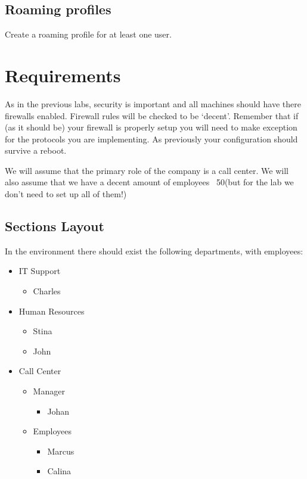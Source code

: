 \documentclass[paper=a4, fontsize=11pt]{report} %
\begin{document}
\subsection{Roaming profiles}
Create a roaming profile for at least one user.

\section{Requirements}
As in the previous labs, security is important and all machines should have there firewalls enabled. Firewall rules will be checked to be ‘decent’. Remember that if (as it should be) your firewall is properly setup you will need to make exception for the protocols you are implementing.
As previously your configuration should survive a reboot.

We will assume that the primary role of the company is a call center. We will also assume that we have a decent amount of employees ~50(but for the lab we don’t need to set up all of them!)
\subsection{Sections Layout}
In the environment there should exist the following departments, with employees:
\begin{itemize}
	\item IT Support
	\begin{itemize}
		\item Charles
	\end{itemize}
\end{itemize}
\begin{itemize}
	\item Human Resources
	\begin{itemize}
		\item Stina
		\item John
	\end{itemize}
\end{itemize}
\begin{itemize}
	\item Call Center
	\begin{itemize}
		\item Manager	
		\begin{itemize}
			\item Johan
		\end{itemize}
		
		\item Employees	
		\begin{itemize}
			\item Marcus
			\item Calina
		\end{itemize}
	\end{itemize}
\end{itemize}
\end{document}
